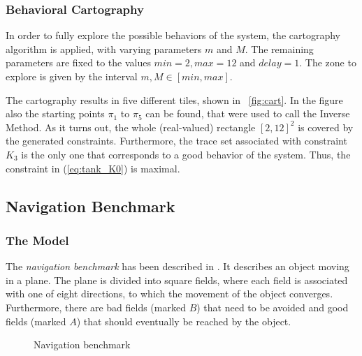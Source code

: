 \documentclass{llncs}
\begin{document}
\subsubsection{Behavioral Cartography}
In order to fully explore the possible behaviors of the system, the
cartography algorithm is applied, with varying parameters $m$ and
$M$. The remaining parameters are fixed to the values $min = 2, max =
12$ and $delay = 1$. The zone to explore is given by the interval $m,M
\in [min,max]$. 

The cartography results in five different tiles, shown in
\figurename~\ref{fig:cart}. In the figure also the starting points $\pi_1$
to $\pi_5$ can be found, that were used to call the Inverse Method. As
it turns out, the whole (real-valued) rectangle $[2, 12]^2$ is covered
by the generated constraints. Furthermore, the trace set associated
with constraint $K_3$ is the only one that corresponds to a good
behavior of the system. Thus, the constraint in (\ref{eq:tank_K0}) is
maximal. 

\subsection{Navigation Benchmark} \label{sec:nav}
\subsubsection{The Model}
The \emph{navigation benchmark} has been described in
\cite{FI:2004}. It describes an object moving in a plane. The plane is
divided into square fields, where each field is associated with one of
eight directions, to which the movement of the object
converges. Furthermore, there are bad fields (marked $B$) that need to
be avoided and good fields (marked $A$) that should eventually be
reached by the object.

\begin{figure}[t]
  \centering
  \hfill
  \caption{Navigation benchmark}
\end{figure}
\end{document}

